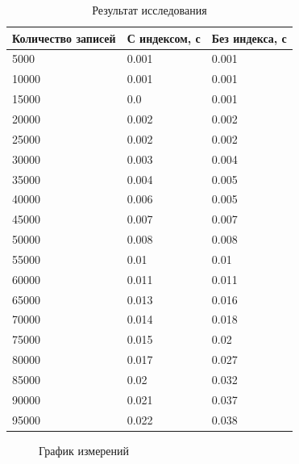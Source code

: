 \begin{table}[ht!]
	\centering
	\caption{Результат исследования}
	\label{tab:measure}
	\begin{tabular}{|p{5.5cm}|p{4cm}|p{4cm}|}
		\hline
		\textbf{Количество записей} & \textbf{С индексом, с} & \textbf{Без индекса, с} \\
		\hline
		5000 & 0.001 & 0.001 \\
		\hline
		10000 & 0.001 & 0.001 \\
		\hline
		15000 & 0.0 & 0.001 \\
		\hline
		20000 & 0.002 & 0.002 \\
		\hline
		25000 & 0.002 & 0.002 \\
		\hline
		30000 & 0.003 & 0.004 \\
		\hline
		35000 & 0.004 & 0.005 \\
		\hline
		40000 & 0.006 & 0.005 \\
		\hline
		45000 & 0.007 & 0.007 \\
		\hline
		50000 & 0.008 & 0.008 \\
		\hline
		55000 & 0.01 & 0.01 \\
		\hline
		60000 & 0.011 & 0.011 \\
		\hline
		65000 & 0.013 & 0.016 \\
		\hline
		70000 & 0.014 & 0.018 \\
		\hline
		75000 & 0.015 & 0.02 \\
		\hline
		80000 & 0.017 & 0.027 \\
		\hline
		85000 & 0.02 & 0.032 \\
		\hline
		90000 & 0.021 & 0.037 \\
		\hline
		95000 & 0.022 & 0.038 \\
		\hline
	\end{tabular}
\end{table}

\begin{figure}[h!]
	\caption{График измерений}
	\label{fig:graph}
\end{figure}

